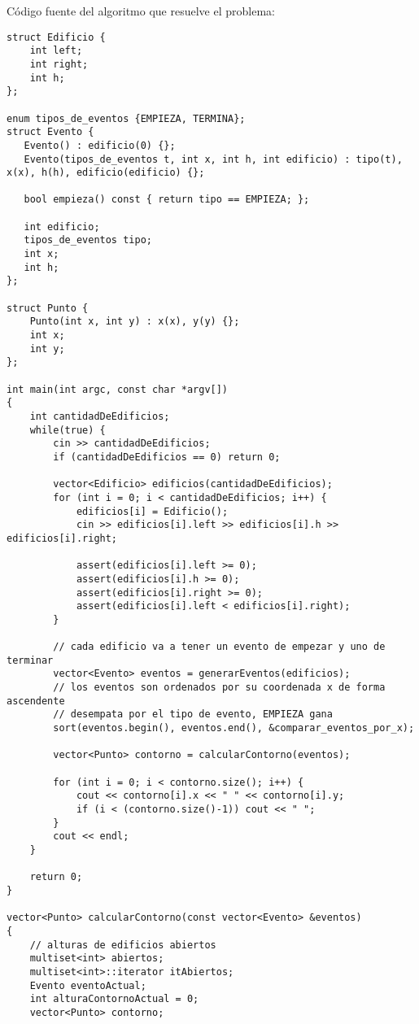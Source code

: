 Código fuente del algoritmo que resuelve el problema:
\begin{lstlisting}[frame=single]
struct Edificio {
    int left;
    int right;
    int h;
};

enum tipos_de_eventos {EMPIEZA, TERMINA};
struct Evento {
   Evento() : edificio(0) {};
   Evento(tipos_de_eventos t, int x, int h, int edificio) : tipo(t), x(x), h(h), edificio(edificio) {};

   bool empieza() const { return tipo == EMPIEZA; };

   int edificio;
   tipos_de_eventos tipo;
   int x;
   int h;
};

struct Punto {
    Punto(int x, int y) : x(x), y(y) {};
    int x;
    int y;
};

int main(int argc, const char *argv[])
{
    int cantidadDeEdificios;
    while(true) {
        cin >> cantidadDeEdificios;
        if (cantidadDeEdificios == 0) return 0;

        vector<Edificio> edificios(cantidadDeEdificios);
        for (int i = 0; i < cantidadDeEdificios; i++) {
            edificios[i] = Edificio();
            cin >> edificios[i].left >> edificios[i].h >> edificios[i].right;

            assert(edificios[i].left >= 0);
            assert(edificios[i].h >= 0);
            assert(edificios[i].right >= 0);
            assert(edificios[i].left < edificios[i].right);
        }

        // cada edificio va a tener un evento de empezar y uno de terminar
        vector<Evento> eventos = generarEventos(edificios);
        // los eventos son ordenados por su coordenada x de forma ascendente
        // desempata por el tipo de evento, EMPIEZA gana
        sort(eventos.begin(), eventos.end(), &comparar_eventos_por_x);

        vector<Punto> contorno = calcularContorno(eventos);

        for (int i = 0; i < contorno.size(); i++) {
            cout << contorno[i].x << " " << contorno[i].y;
            if (i < (contorno.size()-1)) cout << " ";
        }
        cout << endl;
    }

    return 0;
}

vector<Punto> calcularContorno(const vector<Evento> &eventos)
{
    // alturas de edificios abiertos
    multiset<int> abiertos;
    multiset<int>::iterator itAbiertos;
    Evento eventoActual;
    int alturaContornoActual = 0;
    vector<Punto> contorno;


\end{lstlisting}
